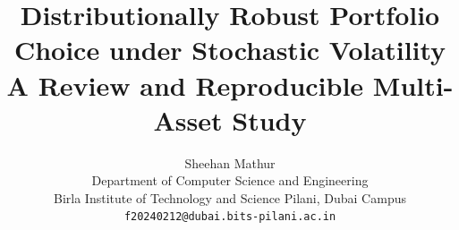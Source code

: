 \documentclass[10pt,twocolumn]{article}
\title{\bfseries Distributionally Robust Portfolio Choice under Stochastic Volatility\\[3pt]\Large A Review and Reproducible Multi-Asset Study}
\author{Sheehan Mathur\\[5pt]\normalsize Department of Computer Science and Engineering\\\normalsize Birla Institute of Technology and Science Pilani, Dubai Campus\\\normalsize\texttt{f20240212@dubai.bits-pilani.ac.in}}
\date{}
\begin{document}
\maketitle






\FloatBarrier
\balance

\begingroup\small\raggedright\endgroup
\end{document}
